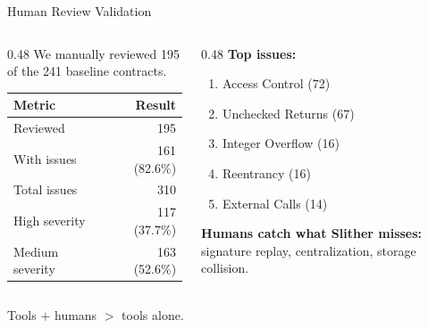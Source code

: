 \documentclass[aspectratio=169]{beamer}
\begin{document}
\begin{frame}{Human Review Validation}
\begin{columns}
\begin{column}{0.48\textwidth}
\small
We manually reviewed 195 of the 241 baseline contracts.

\vspace{0.3cm}
\begin{tabular}{@{}lr@{}}
\toprule
\textbf{Metric} & \textbf{Result} \\
\midrule
Reviewed & 195 \\
With issues & 161 (82.6\%) \\
Total issues & 310 \\
High severity & 117 (37.7\%) \\
Medium severity & 163 (52.6\%) \\
\bottomrule
\end{tabular}
\end{column}
\begin{column}{0.48\textwidth}
\textbf{Top issues:}
\begin{enumerate}\small
    \item Access Control (72)
    \item Unchecked Returns (67)
    \item Integer Overflow (16)
    \item Reentrancy (16)
    \item External Calls (14)
\end{enumerate}

\vspace{0.3cm}
\textbf{Humans catch what Slither misses:} signature replay, centralization, storage collision.
\end{column}
\end{columns}

\vspace{0.2cm}
\begin{block}{}
\centering Tools $+$ humans $>$ tools alone.
\end{block}
\end{frame}
\end{document}
